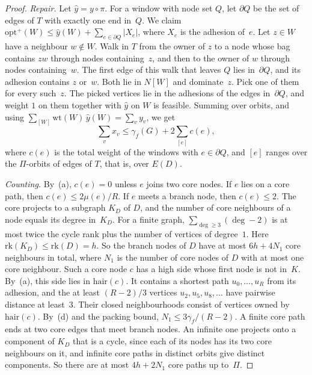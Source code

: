 \documentclass[11pt]{article}
\theoremstyle{remark}
\begin{document}
\begin{proof}
\emph{Repair.} Let $\hat y=y\circ\pi$. For a
window with node set $Q$, let $\partial Q$ be the set of edges of $T$ with exactly one end in~$Q$. We
claim $\mathrm{opt}^+(W)\le\hat y(W)+\sum_{e\in\partial Q}|X_e|$, where $X_e$ is the adhesion of~$e$.
Let $z\in W$ have a neighbour $w\notin W$. Walk in $T$ from the owner of $z$ to a node whose bag
contains $zw$ through nodes containing~$z$, and then to the owner of $w$ through nodes containing~$w$.
The first edge of this walk that leaves $Q$ lies in~$\partial Q$, and its adhesion contains $z$ or~$w$.
Both lie in $N[W]$ and dominate~$z$. Pick one of them for every such~$z$. The picked vertices lie in
the adhesions of the edges in~$\partial Q$, and weight $1$ on them together with $\hat y$ on $W$ is
feasible.
Summing over orbits, and using $\sum_{[W]}\mathrm{wt}(W)\,\hat y(W)=\sum_vy_v$, we get
\[
  \sum_vx_v\le\gamma_f(G)+2\sum_{[e]}c(e),
\]
where $c(e)$ is the total weight of the windows with $e\in\partial Q$, and $[e]$ ranges over the
$\Pi$-orbits of edges of $T$, that is, over $E(D)$.

\emph{Counting.} By~(a), $c(e)=0$ unless $e$ joins two core nodes. If $e$ lies on a core
path, then $c(e)\le2\mu(e)/R$. If $e$ meets a branch node, then $c(e)\le2$. The core projects to
a subgraph $K_D$ of $D$, and the number of core neighbours of a node equals its degree in~$K_D$. For
a finite graph, $\sum_{\deg\ge3}(\deg-2)$ is at most twice the cycle rank plus the number of
vertices of degree~$1$. Here $\mathrm{rk}(K_D)\le\mathrm{rk}(D)=h$. So the branch nodes of $D$ have at
most $6h+4N_1$ core neighbours in total, where $N_1$ is the number of core nodes of $D$ with at most
one core neighbour. Such a core node $c$ has a high side whose first node is not in~$K$. By~(a), this
side lies in $\mathrm{hair}(c)$. It contains a shortest path $u_0,\dots,u_R$ from its adhesion, and
the at least $(R-2)/3$ vertices $u_2,u_5,u_8,\dots$ have pairwise distance at least~$3$. Their closed
neighbourhoods consist of vertices owned by $\mathrm{hair}(c)$. By~(d) and the packing bound,
$N_1\le3\gamma_f/(R-2)$. A finite core path ends at two core edges that meet branch nodes. An
infinite one projects onto a component of $K_D$ that is a cycle, since each of its nodes has its two
core neighbours on it, and infinite core paths in distinct orbits give distinct components. So there
are at most $4h+2N_1$ core paths up to~$\Pi$.


\end{proof}
\end{document}
